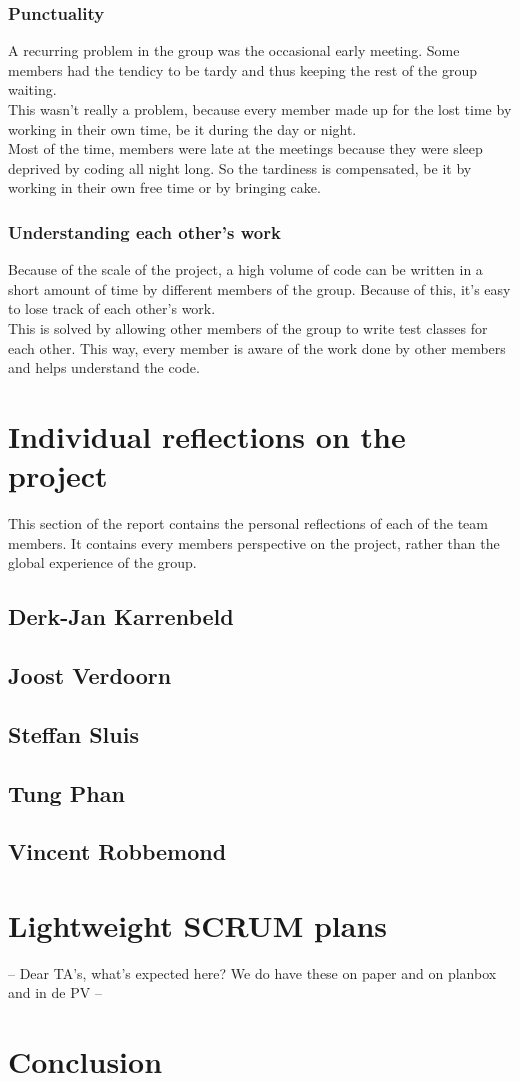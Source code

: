 \documentclass[10pt,a4paper]{report}
\begin{document}
			\subsubsection*{Punctuality}
				A recurring problem in the group was the occasional early meeting. Some members had the tendicy to be tardy and thus keeping the rest of the group waiting. \\
				This wasn't really a problem, because every member made up for the lost time by working in their own time, be it during the day or night. \\
				Most of the time, members were late at the meetings because they were sleep deprived by coding all night long. So the tardiness is compensated, be it by working in their own free time or by bringing cake.
			\subsubsection*{Understanding each other's work}
				Because of the scale of the project, a high volume of code can be written in a short amount of time by 	different members of the group. Because of this, it's easy to lose track of each other's work. \\
				This is solved by allowing other members of the group to write test classes for each other. This way, every member is aware of the work done by other members and helps understand the code.

	\section{Individual reflections on the project}
		This section of the report contains the personal reflections of each of the team members. It contains every members perspective on the project, rather than the global experience of the group.
		\subsection{Derk-Jan Karrenbeld}
			
		\subsection{Joost Verdoorn}
			
		\subsection{Steffan Sluis}
			
		\subsection{Tung Phan}
			
		\subsection{Vincent Robbemond}
			
		
	\section{Lightweight SCRUM plans}
		-- Dear TA's, what's expected here? We do have these on paper and on planbox and in de PV --
	
		
	\section{Conclusion}
	
\end{document}
